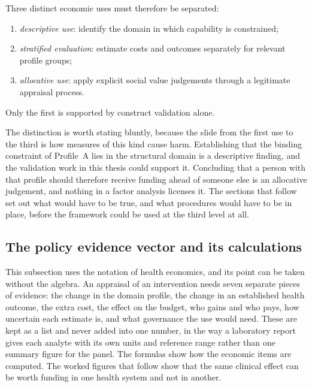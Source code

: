 Three distinct economic uses must therefore be separated:
\begin{enumerate}
 \item \emph{descriptive use}: identify the domain in which capability is
 constrained;
 \item \emph{stratified evaluation}: estimate costs and outcomes separately
 for relevant profile groups;
 \item \emph{allocative use}: apply explicit social value judgements through
 a legitimate appraisal process.
\end{enumerate}
Only the first is supported by construct validation alone.

The distinction is worth stating bluntly, because the slide from the first use
to the third is how measures of this kind cause harm. Establishing that the
binding constraint of Profile~A lies in the structural domain is a descriptive
finding, and the validation work in this thesis could support it. Concluding
that a person with that profile should therefore receive funding ahead of
someone else is an allocative judgement, and
nothing in a factor analysis licenses it. The sections that follow set out what
would have to be true, and what procedures would have to be in place, before
the framework could be used at the third level at all.

\subsection{The policy evidence vector and its calculations}

This subsection uses the notation of health economics, and its point can be taken without the algebra. An appraisal of an intervention needs seven separate pieces of evidence: the change in the domain profile, the change in an established health outcome, the extra cost, the effect on the budget, who gains and who pays, how uncertain each estimate is, and what governance the use would need. These are kept as a list and never added into one number, in the way a laboratory report gives each analyte with its own units and reference range rather than one summary figure for the panel. The formulas show how the economic items are computed. The worked figures that follow show that the same clinical effect can be worth funding in one health system and not in another.

